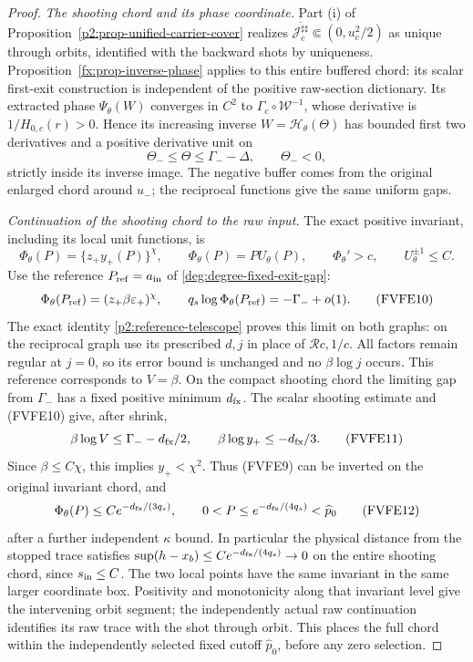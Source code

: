 \begin{proof}
\emph{The shooting chord and its phase coordinate.}
Part (i) of Proposition~\ref{p2:prop-unified-carrier-cover} realizes
$\overline{\mathcal J_c^{\sharp\sharp}}\Subset(0,u_c^2/2)$ as
unique through orbits, identified with the backward shots by uniqueness.
Proposition~\ref{fx:prop-inverse-phase} applies to this entire buffered
chord: its scalar first-exit construction is independent of the
positive raw-section dictionary. Its extracted phase
$\Psi_\theta(W)$ converges in $C^2$ to
$\Gamma_c\circ\mathcal W^{-1}$, whose derivative is
$1/H_{0,c}(r)>0$. Hence its increasing inverse
$W=\mathcal H_\theta(\Theta)$ has bounded first two derivatives
and a positive derivative unit on
\[
 \Theta_-\le\Theta\le\Gamma_- -\Delta,\qquad \Theta_-<0,
 \tag{FVFE8}
\]
strictly inside its inverse image. The negative buffer comes from the
original enlarged chord around $u_-$; the reciprocal functions give
the same uniform gaps.

\emph{Continuation of the shooting chord to the raw input.}
The exact positive invariant, including its local unit functions,
is
\[
 \Phi_\theta(P)=\{z_+y_+(P)\}^{\chi},\qquad
 \Phi_\theta(P)=P U_\theta(P),\qquad
 \Phi_\theta'>c,\qquad U_\theta^{\pm1}\le C.
 \tag{FVFE9}
\]
Use the reference $P_{\rm ref}=a_{\rm in}$ of
\eqref{deg:degree-fixed-exit-gap}:
\[
 \Phi_\theta(P_{\rm ref})=(z_+\beta\varepsilon_+)^\chi,\qquad
 q_s\log\Phi_\theta(P_{\rm ref})=-\Gamma_-+o(1).
 \tag{FVFE10}
\]
The exact identity \eqref{p2:reference-telescope} proves this limit
on both graphs: on the reciprocal graph use its prescribed $d,j$
in place of $\mathcal Rc,1/c$. All factors remain regular at $j=0$,
so its error bound is unchanged and no $\beta\log j$ occurs.
This reference corresponds to $V=\beta$. On the compact shooting chord the limiting
gap from \(\Gamma_-\) has a fixed positive minimum \(d_{\rm fx}\).
The scalar shooting estimate and (FVFE10) give, after shrink,
\[
 \beta\log V\le\Gamma_- -d_{\rm fx}/2,\qquad
 \beta\log y_+\le-d_{\rm fx}/3 .
 \tag{FVFE11}
\]
Since \(\beta\le C\chi\), this implies \(y_+<\chi^2\).
Thus (FVFE9) can be inverted on the original invariant chord, and
\[
 \Phi_\theta(P)\le C e^{-d_{\rm fx}/(3q_s)},\qquad
 0<P\le e^{-d_{\rm fx}/(4q_s)}<\widehat p_0
 \tag{FVFE12}
\]
after a further independent \(\kappa\) bound.
In particular the physical distance from the stopped trace satisfies
\(\sup(h-x_b)\le C e^{-d_{\rm fx}/(4q_s)}\to0\) on the
entire shooting chord, since \(s_{\rm in}\le C\).
The two local points have the same invariant in the same larger
coordinate box. Positivity and monotonicity along that invariant level
give the intervening orbit segment; the independently actual raw
continuation identifies its raw trace with the shot through orbit.
This places the full chord within the independently selected fixed cutoff
$\widehat p_0$, before any zero selection.


\end{proof}
